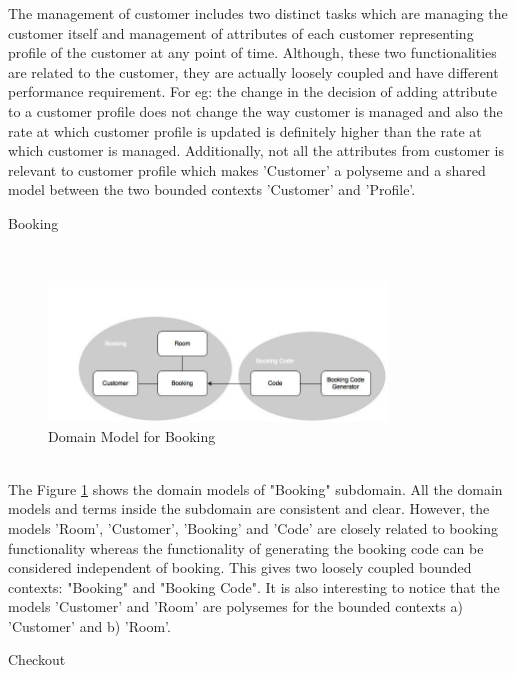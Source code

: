 The management of customer includes two distinct tasks which are managing the customer itself and management of attributes of each customer representing profile of the customer at any point of time. Although, these two functionalities are related to the customer, they are actually loosely coupled and have different performance requirement. For eg: the change in the decision of adding attribute to a customer profile does not change the way customer is managed and also the rate at which customer profile is updated is definitely higher than the rate at which customer is managed. Additionally, not all the attributes from customer is relevant to customer profile which makes 'Customer' a polyseme and a shared model between the two bounded contexts 'Customer' and 'Profile'.\\

\begin{shaded} Booking \end{shaded}
\\
\begin{figure}[H]
\begin{center}
\includegraphics[width=0.8\textwidth]{figures/domain-driven-design-three}
\caption{Domain Model for Booking}
\label{fig:domain_driven_design/example_scenario/subdomains/booking}
\end{center}
\end{figure}
\\
The Figure \ref{fig:domain_driven_design/example_scenario/subdomains/booking} shows the domain models of "Booking" subdomain. All the domain models and terms inside the subdomain are consistent and clear. However, the models 'Room', 'Customer', 'Booking' and 'Code' are closely related to booking functionality whereas the functionality of generating the booking code can be considered independent of booking. This gives two loosely coupled bounded contexts: "Booking" and "Booking Code". It is also interesting to notice that the models 'Customer' and 'Room' are polysemes for the bounded contexts a) 'Customer' and b) 'Room'.\\
\begin{shaded} Checkout \end{shaded}
